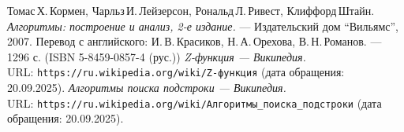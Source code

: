 \begin{thebibliography}{99}
Томас\,Х.\,Кормен, Чарльз\,И.\,Лейзерсон, Рональд\,Л.\,Ривест, Клиффорд\,Штайн.
{\itshape Алгоритмы: построение и анализ, 2-е издание.} --- Издательский дом \enquote{Вильямс}, 2007. Перевод с английского: И.\,В.\,Красиков, Н.\,А.\,Орехова, В.\,Н.\,Романов. --- 1296 с. (ISBN 5-8459-0857-4 (рус.))
{\itshape Z-функция — Википедия.} \\URL: \texttt{https://ru.wikipedia.org/wiki/Z-функция} (дата обращения: 20.09.2025).
{\itshape Алгоритмы поиска подстроки — Википедия.} \\URL: \texttt{https://ru.wikipedia.org/wiki/Алгоритмы\_поиска\_подстроки} (дата обращения: 20.09.2025).
\end{thebibliography}
\pagebreak